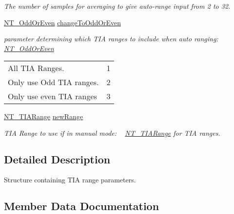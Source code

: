 \begin{DoxyCompactItemize}
\begin{DoxyCompactList}\small\item\em The number of samples for averaging to give auto-\/range input from 2 to 32. \end{DoxyCompactList}\item 
\hyperlink{group___common_gafd24ee04cee037f4d90814dde903e2b2}{N\+T\+\_\+\+Odd\+Or\+Even} \hyperlink{struct_n_t___t_i_a_range_parameters_ac7f8eee4dcc92b12df0ecab2fe741868}{change\+To\+Odd\+Or\+Even}
\begin{DoxyCompactList}\small\item\em parameter determining which T\+IA ranges to include when auto ranging\+: \hyperlink{group___common_gafd24ee04cee037f4d90814dde903e2b2}{N\+T\+\_\+\+Odd\+Or\+Even} \tabulinesep=1mm
\begin{longtabu} spread 0pt [c]{*2{|X[-1]}|}
\hline
All T\+IA Ranges.&1 \\
Only use Odd T\+IA ranges.&2 \\
Only use even T\+IA ranges&3 \\
\end{longtabu}
\end{DoxyCompactList}\item 
\hyperlink{group___common_ga2d700cb6733eb95975d787fb1915a74b}{N\+T\+\_\+\+T\+I\+A\+Range} \hyperlink{struct_n_t___t_i_a_range_parameters_a02d3a0e8bb4c179914d26b5a79a79956}{new\+Range}
\begin{DoxyCompactList}\small\item\em T\+IA Range to use if in manual mode\+: ~\newline
 \hyperlink{group___common_ga2d700cb6733eb95975d787fb1915a74b}{N\+T\+\_\+\+T\+I\+A\+Range} for T\+IA ranges. \end{DoxyCompactList}\end{DoxyCompactItemize}


\subsection{Detailed Description}
Structure containing T\+IA range parameters. 



\subsection{Member Data Documentation}
